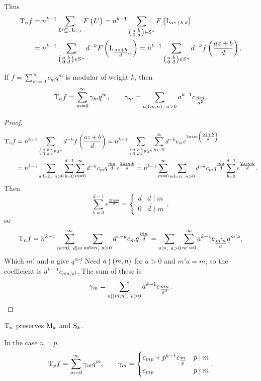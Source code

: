 Thus
\begin{align*}
\T_nf
& = n^{k - 1}\sum_{L' \subseteq_n \L_{z, 1}} F\br{L'}
= n^{k - 1}\sum_{\twobytwosmall{a}{b}{0}{d} \in \S^n} F\br{\L_{az + b, d}} \\
& = n^{k - 1}\sum_{\twobytwosmall{a}{b}{0}{d} \in \S^n} d^{-k}F\br{\L_{\tfrac{az + b}{d}, 1}}
= n^{k - 1}\sum_{\twobytwosmall{a}{b}{0}{d} \in \S^n} d^{-k}f\br{\dfrac{az + b}{d}}.
\end{align*}

\begin{theorem}
If $ f = \sum_{m = 0}^\infty c_mq^m $ is modular of weight $ k $, then
$$ \T_nf = \sum_{m = 0}^\infty \gamma_mq^m, \qquad \gamma_m = \sum_{a \mid \br{m, n}, \ a > 0} a^{k - 1}c_{\tfrac{mn}{a^2}}. $$
\end{theorem}

\begin{proof}
\begin{align*}
\T_nf
& = n^{k - 1}\sum_{\twobytwosmall{a}{b}{0}{d} \in \S^n} d^{-k}f\br{\dfrac{az + b}{d}}
= n^{k - 1}\sum_{\twobytwosmall{a}{b}{0}{d} \in \S^n} \sum_{m = 0}^\infty d^{-k}c_me^{2\pi im\br{\tfrac{az + b}{d}}} \\
& = n^{k - 1}\sum_{ad = n, \ a > 0} \sum_{b = 0}^{d - 1} \sum_{m = 0}^\infty d^{-k}c_mq^{\tfrac{ma}{d}}e^{\tfrac{2\pi imb}{d}}
= n^{k - 1}\sum_{m = 0}^\infty \sum_{ad = n, \ a > 0} d^{-k}c_mq^{\tfrac{ma}{d}}\sum_{b = 0}^{d - 1} e^{\tfrac{2\pi imb}{d}}.
\end{align*}
Then
$$ \sum_{b = 0}^{d - 1} e^{\tfrac{2\pi imb}{d}} =
\begin{cases}
d & d \mid m \\
0 & d \nmid m
\end{cases},
$$
so
$$ \T_nf = n^{k - 1}\sum_{m = 0, \ d \mid m}^\infty \sum_{ad = n, \ a > 0} d^{1 - k}c_mq^{\tfrac{ma}{d}} = \sum_{a \mid n, \ a > 0} \sum_{m' = 0}^\infty a^{k - 1}c_{\tfrac{m'n}{a}}q^{m'a}. $$
Which $ m' $ and $ a $ give $ q^m $? Need $ a \mid \br{m, n} $ for $ a > 0 $ and $ m'a = m $, so the coefficient is $ a^{k - 1}c_{mn / a^2} $. The sum of these is
$$ \gamma_m = \sum_{a \mid \br{m, n}, \ a > 0} a^{k - 1}c_{\tfrac{mn}{a^2}}. $$
\end{proof}

\pagebreak

\begin{corollary}
$ \T_n $ preserves $ \M_k $ and $ \S_k $.
\end{corollary}

In the case $ n = p $,
$$ \T_pf = \sum_{m = 0}^\infty \gamma_mq^m, \qquad \gamma_m =
\begin{cases}
c_{mp} + p^{k - 1}c_{\tfrac{m}{p}} & p \mid m \\
c_{mp} & p \nmid m
\end{cases}.
$$

